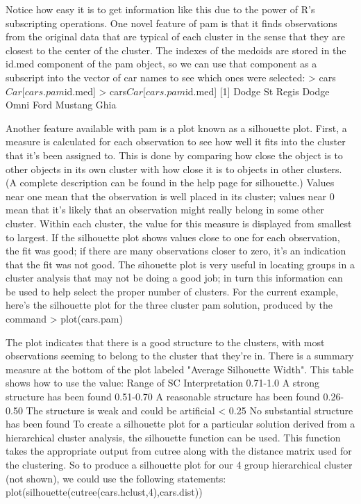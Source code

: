 {Notice how easy it is to get information like this due to the power of R's subscripting operations.
One novel feature of pam is that it finds observations from the original data that are typical of each cluster in the sense that they are closest to the center of the cluster. The indexes of the medoids are stored in the id.med component of the pam object, so we can use that component as a subscript into the vector of car names to see which ones were selected:
> cars$Car[cars.pam$id.med]
> cars$Car[cars.pam$id.med]
[1] Dodge St Regis    Dodge Omni        Ford Mustang Ghia

Another feature available with pam is a plot known as a silhouette plot. First, a measure is calculated for each observation to see how well it fits into the cluster that it's been assigned to. This is done by comparing how close the object is to other objects in its own cluster with how close it is to objects in other clusters. (A complete description can be found in the help page for silhouette.) Values near one mean that the observation is well placed in its cluster; values near 0 mean that it's likely that an observation might really belong in some other cluster. Within each cluster, the value for this measure is displayed from smallest to largest. If the silhouette plot shows values close to one for each observation, the fit was good; if there are many observations closer to zero, it's an indication that the fit was not good. The sihouette plot is very useful in locating groups in a cluster analysis that may not be doing a good job; in turn this information can be used to help select the proper number of clusters. For the current example, here's the silhouette plot for the three cluster pam solution, produced by the command
> plot(cars.pam)


The plot indicates that there is a good structure to the clusters, with most observations seeming to belong to the cluster that they're in. There is a summary measure at the bottom of the plot labeled "Average Silhouette Width". This table shows how to use the value:
Range of SC	Interpretation
0.71-1.0	A strong structure has been found
0.51-0.70	A reasonable structure has been found
0.26-0.50	The structure is weak and could be artificial
< 0.25	No substantial structure has been found
To create a silhouette plot for a particular solution derived from a hierarchical cluster analysis, the silhouette function can be used. This function takes the appropriate output from cutree along with the distance matrix used for the clustering. So to produce a silhouette plot for our 4 group hierarchical cluster (not shown), we could use the following statements:
plot(silhouette(cutree(cars.hclust,4),cars.dist))

}
